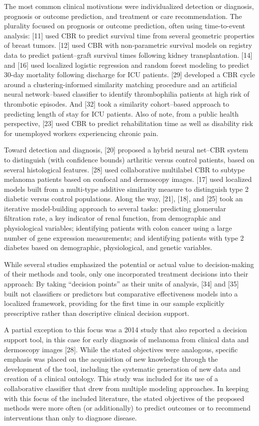 \documentclass[preprint, 3p,
authoryear]{elsarticle} %
\begin{document}
The most common clinical motivations were individualized detection or
diagnosis, prognosis or outcome prediction, and treatment or care
recommendation. The plurality focused on prognosis or outcome
prediction, often using time-to-event analysis: {[}11{]} used CBR to
predict survival time from several geometric properties of breast
tumors. {[}12{]} used CBR with non-parametric survival models on
registry data to predict patient--graft survival times following kidney
transplantation. {[}14{]} and {[}16{]} used localized logistic
regression and random forest modeling to predict 30-day mortality
following discharge for ICU patients. {[}29{]} developed a CBR cycle
around a clustering-informed similarity matching procedure and an
artificial neural network--based classifier to identify thrombophilia
patients at high risk of thrombotic episodes. And {[}32{]} took a
similarity cohort--based approach to predicting length of stay for ICU
patients. Also of note, from a public health perspective, {[}23{]} used
CBR to predict rehabilitation time as well as disability risk for
unemployed workers experiencing chronic pain.

Toward detection and diagnosis, {[}20{]} proposed a hybrid neural
net--CBR system to distinguish (with confidence bounds) arthritic versus
control patients, based on several histological features. {[}28{]} used
collaborative multilabel CBR to subtype melanoma patients based on
confocal and dermoscopy images. {[}17{]} used localized models built
from a multi-type additive similarity measure to distinguish type 2
diabetic versus control populations. Along the way, {[}21{]}, {[}18{]},
and {[}25{]} took an iterative model-building approach to several tasks:
predicting glomerular filtration rate, a key indicator of renal
function, from demographic and physiological variables; identifying
patients with colon cancer using a large number of gene expression
measurements; and identifying patients with type 2 diabetes based on
demographic, physiological, and genetic variables.

While several studies emphasized the potential or actual value to
decision-making of their methods and tools, only one incorporated
treatment decisions into their approach: By taking ``decision points''
as their units of analysis, {[}34{]} and {[}35{]} built not classifiers
or predictors but comparative effectiveness models into a localized
framework, providing for the first time in our sample explicitly
prescriptive rather than descriptive clinical decision support.

A partial exception to this focus was a 2014 study that also reported a
decision support tool, in this case for early diagnosis of melanoma from
clinical data and dermoscopy images {[}28{]}. While the stated
objectives were analogous, specific emphasis was placed on the
acquisition of new knowledge through the development of the tool,
including the systematic generation of new data and creation of a
clinical ontology. This study was included for its use of a
collaborative classifier that drew from multiple modeling approaches. In
keeping with this focus of the included literature, the stated
objectives of the proposed methods were more often (or additionally) to
predict outcomes or to recommend interventions than only to diagnose
disease.
\end{document}
